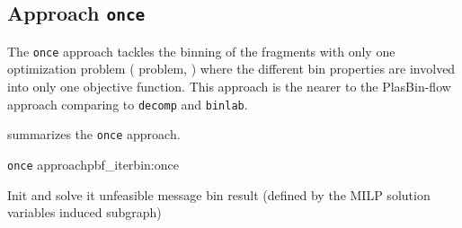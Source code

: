 \subsection{Approach \texttt{once}}\label{sec:pbf_iterbin:once}

The \texttt{once} approach tackles the binning of the fragments with only one optimization problem (\MGCLB{} problem, ) where the different bin properties are involved into only one objective function.
This approach is the nearer to the PlasBin-flow approach comparing to \texttt{decomp} and \texttt{binlab}.

 summarizes the \texttt{once} approach.

\begin{tcbalgo}{\texttt{once} approach}{pbf_iterbin:once}
  \begin{algorithmic}[1]
    \State{} Init \MGCLB{} and solve it
    \State{} \Return{}unfeasible message
    \EndIf{}
    \State{} \Return{}\MGCLB{} bin result (defined by the MILP solution variables induced subgraph)
    \EndFunction{}
  \end{algorithmic}
\end{tcbalgo}

